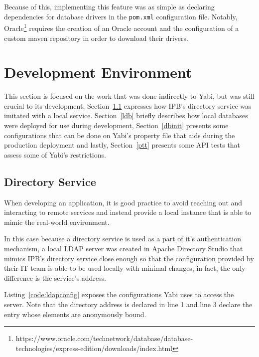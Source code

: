 Because of this, implementing this feature was as simple as declaring dependencies for database drivers in the \texttt{pom.xml} configuration file. Notably, Oracle\footnote{https://www.oracle.com/technetwork/database/database-technologies/express-edition/downloads/index.html} requires the creation of an Oracle account and the configuration of a custom maven repository in order to download their drivers.

\section{Development Environment}\label{cha:implementation:sec:development}
This section is focused on the work that was done indirectly to \gls{Yabi}, but was still crucial to its development. Section~\ref{ds} expresses how \gls{IPB}'s directory service was imitated with a local service. Section~\ref{ldb} briefly describes how local databases were deployed for use during development, Section~\ref{dbinit} presents some configurations that can be done on \gls{Yabi}'s property file that aids during the production deployment and lastly, Section~\ref{ptt} presents some \gls{API} tests that assess some of \gls{Yabi}'s restrictions.

\subsection{Directory Service}\label{ds}
When developing an application, it is good practice to avoid reaching out and interacting to remote services and instead provide a local instance that is able to mimic the real-world environment.

In this case because a directory service is used as a part of it's authentication mechanism, a local \gls{LDAP} server was created in Apache Directory Studio that mimics \gls{IPB}'s directory service close enough so that the configuration provided by their \gls{IT} team is able to be used locally with minimal changes, in fact, the only difference is the service's address.

Listing~\ref{code:ldapconfig} exposes the configurations \gls{Yabi} uses to access the server. Note that the directory address is declared in line 1 and line 3 declare the entry whose elements are anonymously bound.



